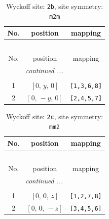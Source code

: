 \documentclass[fleqn,8pt]{jsarticle}
\begin{document}
\begin{longtable}{ccc}
\caption{Wyckoff site: {\tt 2b}, site symmetry: {\tt m2m}}
 \\
 \hline \hline
No. & position & mapping \\ \hline \endfirsthead

\multicolumn{2}{l}{\tablename\ \thetable{}} \\
 \hline \hline
No. & position & mapping \\ \hline \endhead

 \hline \hline
\multicolumn{2}{r}{\footnotesize\it continued ...} \\ \endfoot

 \hline \hline
\multicolumn{2}{r}{} \\ \endlastfoot

1 & $\left[ 0,\, y,\, 0 \right]$ & {\tt [1,3,6,8]} \\ \hline
2 & $\left[ 0,\, - y,\, 0 \right]$ & {\tt [2,4,5,7]} \\
\end{longtable}
\renewcommand{\arraystretch}{1.2}
\begin{longtable}{ccc}
\caption{Wyckoff site: {\tt 2c}, site symmetry: {\tt mm2}}
 \\
 \hline \hline
No. & position & mapping \\ \hline \endfirsthead

\multicolumn{2}{l}{\tablename\ \thetable{}} \\
 \hline \hline
No. & position & mapping \\ \hline \endhead

 \hline \hline
\multicolumn{2}{r}{\footnotesize\it continued ...} \\ \endfoot

 \hline \hline
\multicolumn{2}{r}{} \\ \endlastfoot

1 & $\left[ 0,\, 0,\, z \right]$ & {\tt [1,2,7,8]} \\ \hline
2 & $\left[ 0,\, 0,\, - z \right]$ & {\tt [3,4,5,6]} \\
\end{longtable}
\renewcommand{\arraystretch}{1.2}
\end{document}

